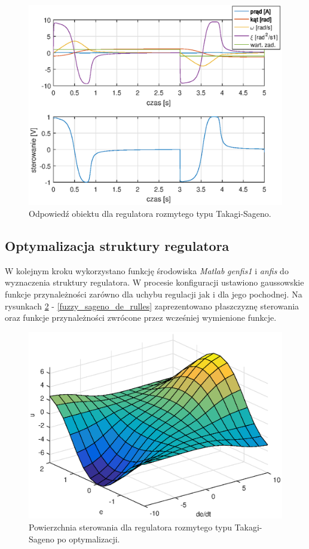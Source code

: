 \begin{figure}[h!]
	\centering
	\includegraphics[scale = 0.8]{fig/fuzzy_sagenoMan_odp.eps}
	\caption		
	{Odpowied\'z obiektu dla regulatora rozmytego typu Takagi-Sageno.}
	\label{fuzzy_sageno_man}
\end{figure}
\FloatBarrier
\newpage

\subsection{Optymalizacja struktury regulatora}
W kolejnym kroku wykorzystano funkcję środowiska \textit{Matlab} \textit{genfis1} i \textit{anfis} do wyznaczenia struktury regulatora. W procesie konfiguracji ustawiono gaussowskie funkcje przynależności zarówno dla uchybu regulacji jak i dla jego pochodnej. Na rysunkach \ref{fuzzy_sageno_sufrace} - \ref{fuzzy_sageno_de_rulles} zaprezentowano płaszczyznę sterowania oraz funkcje przynależności zwrócone przez wcześniej wymienione funkcje.
\begin{figure}[h!]
	\centering
	\includegraphics[scale = 0.8]{fig/sagenoOptSurface.eps}
	\caption		
	{Powierzchnia sterowania dla regulatora rozmytego typu Takagi-Sageno po optymalizacji.}
	\label{fuzzy_sageno_sufrace}
\end{figure}

